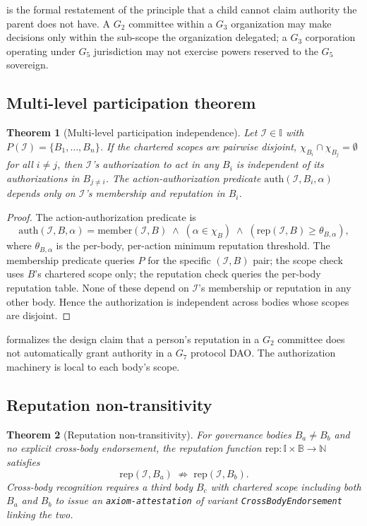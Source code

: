 \documentclass[11pt,a4paper,parskip=half-,DIV=12,headings=standardclasses]{scrartcl}
\theoremstyle{ncthm}
\newtheorem{theorem}{Theorem}[section]
\theoremstyle{ncdef}
\newcommand{\identity}{\mathcal{I}}
\begin{document}
 is the formal restatement of the principle
that a child cannot claim authority the parent does not have. A
$G_2$ committee within a $G_3$ organization may make decisions only
within the sub-scope the organization delegated; a $G_3$ corporation
operating under $G_5$ jurisdiction may not exercise powers reserved
to the $G_5$ sovereign.

\subsection{Multi-level participation theorem}

\begin{theorem}[Multi-level participation independence]\label{thm:multi-level}
Let $\identity \in \mathbb{I}$ with
$P(\identity) = \{B_1, \ldots, B_n\}$. If the chartered scopes are
pairwise disjoint, $\chi_{B_i} \cap \chi_{B_j} = \emptyset$ for
all $i \neq j$, then $\identity$'s authorization to act in any
$B_i$ is independent of its authorizations in $B_{j \neq i}$. The
action-authorization predicate
$\mathrm{auth}(\identity, B_i, \alpha)$ depends only on
$\identity$'s membership and reputation in $B_i$.
\end{theorem}

\begin{proof}
The action-authorization predicate is
\[
\mathrm{auth}(\identity, B, \alpha) =
  \mathrm{member}(\identity, B) \;\land\;
  (\alpha \in \chi_B) \;\land\;
  (\mathrm{rep}(\identity, B) \geq \theta_{B,\alpha}),
\]
where $\theta_{B,\alpha}$ is the per-body, per-action minimum
reputation threshold. The membership predicate queries $P$ for the
specific $(\identity, B)$ pair; the scope check uses $B$'s chartered
scope only; the reputation check queries the per-body reputation
table. None of these depend on $\identity$'s membership or reputation
in any other body. Hence the authorization is independent across
bodies whose scopes are disjoint.
\end{proof}

 formalizes the design claim that a person's
reputation in a $G_2$ committee does not automatically grant authority
in a $G_7$ protocol DAO. The authorization machinery is local to
each body's scope.

\subsection{Reputation non-transitivity}

\begin{theorem}[Reputation non-transitivity]\label{thm:rep-nontransitive}
For governance bodies $B_a \neq B_b$ and no explicit cross-body
endorsement, the reputation function
$\mathrm{rep}: \mathbb{I} \times \mathbb{B} \to \mathbb{N}$ satisfies
\[
\mathrm{rep}(\identity, B_a) \;\not\Rightarrow\;
\mathrm{rep}(\identity, B_b).
\]
Cross-body recognition requires a third body $B_c$ with chartered
scope including both $B_a$ and $B_b$ to issue an
\texttt{axiom-attestation} of variant
\texttt{CrossBodyEndorsement} linking the two.
\end{theorem}
\end{document}
